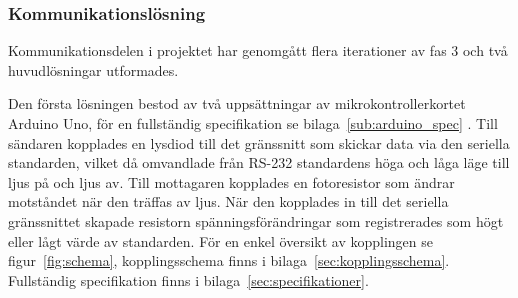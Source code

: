         \subsubsection{Kommunikationslösning} %
        \label{ssub:utformning_av_kommunikationslosning}
            Kommunikationsdelen i projektet har genomgått flera iterationer av fas 3 och två huvudlösningar utformades.\bigskip 

            Den första lösningen bestod av två uppsättningar av mikrokontrollerkortet Arduino Uno, för en fullständig specifikation se bilaga~\ref{sub:arduino_spec} \cite{ardu}. Till sändaren kopplades en lysdiod till det gränssnitt som skickar data via den seriella standarden, vilket då omvandlade från RS-232 standardens höga och låga läge till ljus på och ljus av. Till mottagaren kopplades en fotoresistor som ändrar motståndet när den träffas av ljus. När den kopplades in till det seriella gränssnittet skapade resistorn spänningsförändringar som registrerades som högt eller lågt värde av standarden. För en enkel översikt av kopplingen se figur~\ref{fig:schema}, kopplingsschema finns i bilaga~\ref{sec:kopplingsschema}. Fullständig specifikation finns i bilaga~\ref{sec:specifikationer}.\bigskip


